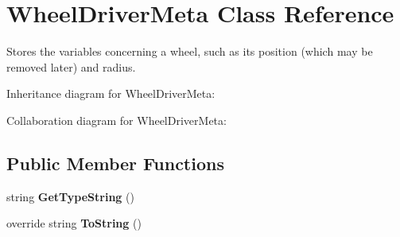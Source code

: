 \hypertarget{class_wheel_driver_meta}{}\section{Wheel\+Driver\+Meta Class Reference}
\label{class_wheel_driver_meta}


Stores the variables concerning a wheel, such as its position (which may be removed later) and radius.  




Inheritance diagram for Wheel\+Driver\+Meta\+:


Collaboration diagram for Wheel\+Driver\+Meta\+:
\subsection*{Public Member Functions}
\begin{DoxyCompactItemize}
\item 
\mbox{\label{class_wheel_driver_meta_a030e792ff0478d5023ab3f65a6e982c1}} 
string {\bfseries Get\+Type\+String} ()
\item 
\mbox{\label{class_wheel_driver_meta_a42e0ef28c13d44c3825e947c5543f1b6}} 
override string {\bfseries To\+String} ()
\end{DoxyCompactItemize}
